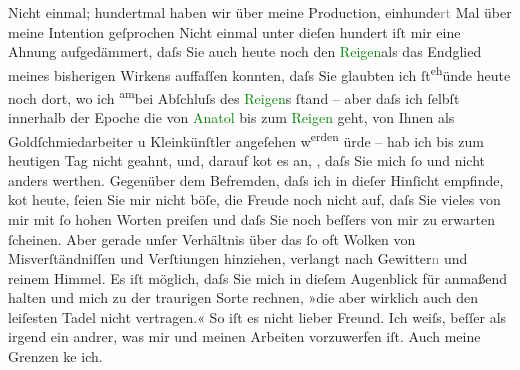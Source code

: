                Nicht einmal; hundertmal haben wir über meine Production,
                  einhunde\textcolor{gray}{rt} Mal über meine Intention geſprochen{\dotstwo} Nicht einmal unter dieſen hundert iſt mir eine Ahnung
               aufgedämmert, daſs Sie auch heute noch den \textcolor{green}{Reigen}{}\ledrightnote{\textcolor{green}{Reigen. Zehn Dialoge}}{ }{\pb}als das Endglied meines bisherigen Wirkens
               auffaſſen konnten, daſs Sie glaubten ich ſt\substVorne{}\textsuperscript{eh}\substDazwischen{}ünd\substHinten{}e heute noch dort, wo ich \substVorne{}\textsuperscript{am}\substDazwischen{}bei\substHinten{} Abſchluſs des \textcolor{green}{Reigen}{}\ledrightnote{\textcolor{green}{Reigen. Zehn Dialoge}}s ſtand – aber \introOben{}daſs ich\introOben{} ſelbſt innerhalb der
               Epoche die von \textcolor{green}{Anatol}{}\ledrightnote{\textcolor{green}{Anatol}} bis zum \textcolor{green}{Reigen}{}\ledrightnote{\textcolor{green}{Reigen. Zehn Dialoge}} geht, von Ihnen als Goldſchmiedarbeiter u
               Kleinkünſtler angeſehen w\substVorne{}\textsuperscript{erden }{\allowbreak}\substDazwischen{}ürde\substHinten{} – hab ich bis {\pb}zum heutigen Tag
               nicht geahnt, und, darauf ko{\geminationm}t es an, \label{T_L02988-5v}\label{T_L02988-5h}, daſs Sie mich ſo und nicht anders werthen. Gegenüber dem
               Befremden, daſs ich in dieſer Hinſicht empfinde, ko{\geminationm}t
               heute, ſeien Sie mir nicht böſe, die Freude noch nicht {\pb}auf, daſs Sie vieles von mir mit ſo hohen
               Worten preiſen und daſs Sie noch beſſers von mir zu erwarten ſcheinen. Aber gerade
               unſer Verhältnis \introOben{}über\introOben{} das ſo oft \strikeout{\textcolor{gray}{×}\-\textcolor{gray}{×}\-\textcolor{gray}{×}\-\textcolor{gray}{×}} Wolken von Misverſtändniſſen und Verſti{\geminationm}ungen
               hinziehen, verlangt nach Gewitter\textcolor{gray}{n} und reinem Himmel. Es iſt
               möglich, daſs Sie mich in dieſem Augenblick für {\pb}anmaßend halten und mich zu der traurigen
               Sorte rechnen, »die aber wirklich auch den leiſesten Tadel nicht vertragen.« So iſt
               es nicht lieber Freund. Ich weiſs, beſſer als irgend ein andrer, was mir und meinen
               Arbeiten vorzuwerfen iſt. Auch meine Grenzen ke{\geminationn} ich.

